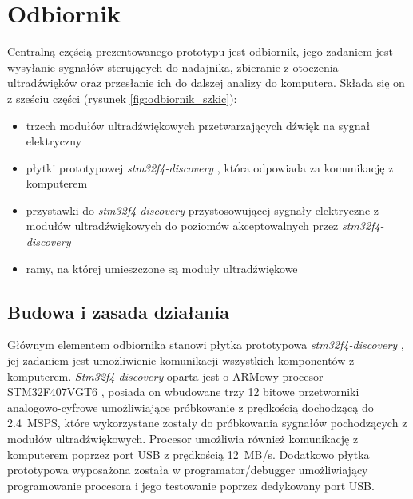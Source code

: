 \chapter{Odbiornik}


Centralną częścią prezentowanego prototypu jest odbiornik,
jego zadaniem jest wysyłanie sygnałów sterujących do nadajnika, zbieranie z otoczenia ultradźwięków oraz przesłanie
ich do dalszej analizy do komputera.
Składa się on z sześciu części (rysunek \ref{fig:odbiornik_szkic}):

\begin{itemize}
 \item trzech modułów ultradźwiękowych przetwarzających dźwięk na sygnał elektryczny
 \item płytki prototypowej \textit{stm32f4-discovery} \cite{bib:stm32f4Discovery}, która odpowiada za komunikację z komputerem
 \item przystawki do \textit{stm32f4-discovery} przystosowującej sygnały elektryczne z modułów ultradźwiękowych
  do poziomów akceptowalnych przez \textit{stm32f4-discovery}
 \item ramy, na której umieszczone są moduły ultradźwiękowe
\end{itemize}




\section{Budowa i zasada działania}

Głównym elementem odbiornika stanowi płytka prototypowa \textit{stm32f4-discovery} \cite{bib:stm32f4Discovery},
jej zadaniem jest umożliwienie komunikacji wszystkich komponentów z komputerem.
\textit{Stm32f4-discovery} oparta jest o ARMowy procesor STM32F407VGT6 \cite{bib:stm32f407}, posiada on wbudowane trzy 12 bitowe przetworniki
analogowo-cyfrowe umożliwiające próbkowanie z prędkością dochodzącą do \SI{2,4}{MSPS}, które wykorzystane zostały do próbkowania
sygnałów pochodzących z modułów ultradźwiękowych. Procesor umożliwia również komunikację z komputerem poprzez 
port USB z prędkością \SI{12}{MB/s}. Dodatkowo płytka prototypowa wyposażona została w programator/debugger 
umożliwiający programowanie procesora i jego testowanie poprzez dedykowany port USB.

